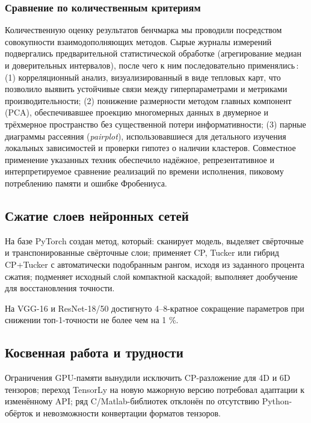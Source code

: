 \subsubsection*{Сравнение по количественным критериям}
Количественную оценку результатов бенчмарка мы проводили посредством совокупности взаимодополняющих методов. Сырые журналы измерений подвергались предварительной статистической обработке (агрегирование медиан и доверительных интервалов), после чего к ним последовательно применялись\,: (1) корреляционный анализ, визуализированный в виде тепловых карт, что позволило выявить устойчивые связи между гиперпараметрами и метриками производительности; (2) понижение размерности методом главных компонент (PCA), обеспечивавшее проекцию многомерных данных в двумерное и трёхмерное пространство без существенной потери информативности; (3) парные диаграммы рассеяния (\textit{pairplot}), использовавшиеся для детального изучения локальных зависимостей и проверки гипотез о наличии кластеров. Совместное применение указанных техник обеспечило надёжное, репрезентативное и интерпретируемое сравнение реализаций по времени исполнения, пиковому потреблению памяти и ошибке Фробениуса.

\subsection*{Сжатие слоев нейронных сетей}  
На базе PyTorch создан метод, который: сканирует модель, выделяет свёрточные и транспонированные свёрточные слои; применяет CP, Tucker или гибрид CP+Tucker с автоматически подобранным рангом, исходя из заданного процента сжатия; подменяет исходный слой компактной каскадой; выполняет дообучение для восстановления точности.

На VGG-16 и ResNet-18/50 достигнуто 4–8-кратное сокращение параметров при снижении топ-1-точности не более чем на 1 \%.

\subsection*{Косвенная работа и трудности}  
 Ограничения GPU-памяти вынудили исключить CP-разложение для 4D и 6D тензоров; переход TensorLy на новую мажорную версию потребовал адаптации к изменённому API; ряд C/Matlab-библиотек отклонён по отсутствию Python-обёрток и невозможности конвертации форматов тензоров.